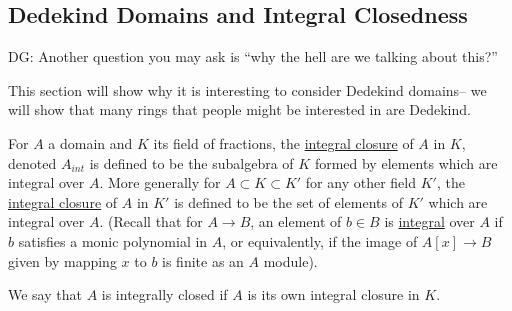\documentclass[12 pt]{article}
\theoremstyle{definition}
\begin{document}
\subsection{Dedekind Domains and Integral Closedness}

DG: Another question you may ask is ``why the hell are we talking about this?''

This section will show why it is interesting to consider Dedekind domains-- we will show that many rings that people might be interested in are Dedekind.


\begin{definition} For $A$ a domain and $K$ its field of fractions, the \uline{integral closure} of $A$ in $K$, denoted $A_{int}$ is defined to be the subalgebra of $K$ formed by elements which are integral over $A$. More generally for $A \subset K \subset K'$ for any other field $K'$, the \uline{integral closure} of $A$ in $K'$ is defined to be the set of elements of $K'$ which are integral over $A$. (Recall that for $A \to B$, an element of $b \in B$ is \uline{integral} over $A$ if $b$ satisfies a monic polynomial in $A$, or equivalently, if the image of $A[x] \to B$ given by mapping $x$ to $b$ is finite as an $A$ module).
\end{definition}



\begin{definition} We say that $A$ is integrally closed if $A$ is its own integral closure in $K$.
\end{definition}
\end{document}
